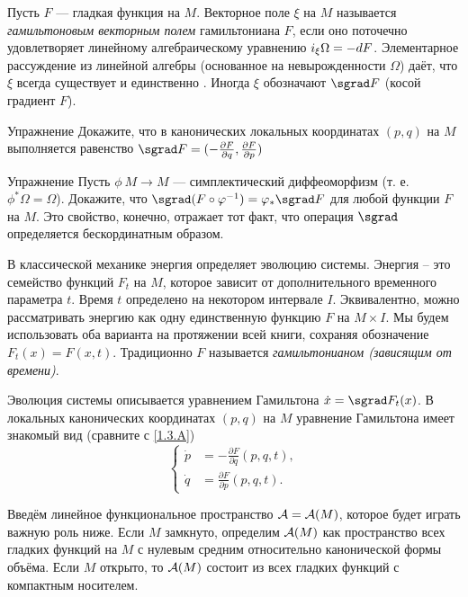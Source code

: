 Пусть $F$ --- гладкая функция на $M$.
Векторное поле $\xi$ на $M$ называется \emph{гамильтоновым векторным полем} гамильтониана $F$, если оно поточечно удовлетворяет линейному алгебраическому уравнению $i_\xi \Omega \z= -dF$.
Элементарное рассуждение из линейной алгебры (основанное на невырожденности $\Omega$) даёт, что $\xi$ всегда существует и единственно \cite{MS}.
Иногда $\xi$ обозначают $\sgrad F$ (косой градиент $F$).

\begin{thm}{Упражнение}\label{1.3.A}
Докажите, что в канонических локальных координатах $(p, q)$ на
$M$ выполняется равенство  $\sgrad F = (-\tfrac{\partial F}{\partial q},\tfrac{\partial F}{\partial p})$
\end{thm}

\begin{thm}{Упражнение}\label{1.3.B}
Пусть  $\phi\: M \to M$ --- симплектический диффеоморфизм
(т. е. $\phi^\ast \Omega = \Omega$).
Докажите, что $\sgrad (F \circ \phi^{-1}) \z= \phi_\ast \sgrad F$ для любой функции $F$ на $M$.
Это свойство, конечно, отражает тот факт, что операция $\sgrad$ определяется бескординатным образом.
\end{thm}


В классической механике энергия определяет эволюцию системы.
Энергия -- это семейство функций $F_t$ на $M$, которое зависит от
дополнительного временного параметра $t$.
Время $t$ определено на некотором интервале $I$.
Эквивалентно, можно рассматривать энергию как одну единственную функцию $F$ на $M \times I$.
Мы будем использовать оба варианта на протяжении всей книги, сохраняя обозначение $F_t (x) = F (x, t)$.
Традиционно $F$ называется \emph{гамильтонианом (зависящим от времени)}.

Эволюция системы описывается уравнением Гамильтона $\dot x \z= \sgrad F_t (x)$.
В локальных канонических координатах $(p, q)$ на $M$ уравнение
Гамильтона имеет знакомый вид (сравните с \ref{1.3.A})
\[
\begin{cases}
\dot p &= - \tfrac{\partial F}{\partial q} (p, q, t),\\
\dot q &= \tfrac{\partial F}{\partial p} (p, q, t).
\end{cases}
\]

Введём линейное функциональное пространство $\mathcal{A} = \mathcal{A} (M)$, которое будет играть важную роль ниже.
Если $M$ замкнуто, определим $\mathcal{A}(M)$ как пространство всех гладких функций на $M$ с нулевым средним относительно канонической формы объёма.
Если $M$ открыто, то $\mathcal{A}(M)$ состоит из всех гладких функций с компактным носителем.

